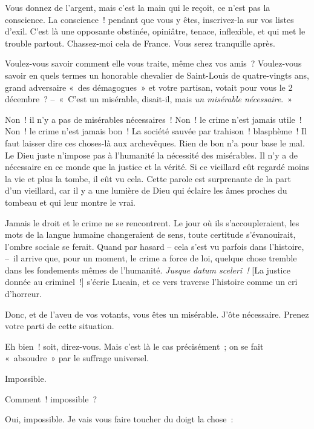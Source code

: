 \documentclass[french,twoside]{book} %
\begin{document}
Vous donnez de l’argent, mais c’est la main qui le reçoit, ce n’est pas la conscience. La conscience ! pendant que vous y êtes, inscrivez-la sur vos listes d’exil. C’est là une opposante obstinée, opiniâtre, tenace, inflexible, et qui met le trouble partout. Chassez-moi cela de France. Vous serez tranquille après.\par
Voulez-vous savoir comment elle vous traite, même chez vos amis ? Voulez-vous savoir en quels termes un honorable chevalier de Saint-Louis de quatre-vingts ans, grand adversaire « des démagogues » et votre partisan, votait pour vous le 2 décembre ? – « C’est un misérable, disait-il, mais \emph{un misérable nécessaire}. »\par
Non ! il n’y a pas de misérables nécessaires ! Non ! le crime n’est jamais utile ! Non ! le crime n’est jamais bon ! La société sauvée par trahison ! blasphème ! Il faut laisser dire ces choses-là aux archevêques. Rien de bon n’a pour base le mal. Le Dieu juste n’impose pas à l’humanité la nécessité des misérables. Il n’y a de nécessaire en ce monde que la justice et la vérité. Si ce vieillard eût regardé moins la vie et plus la tombe, il eût vu cela. Cette parole est surprenante de la part d’un vieillard, car il y a une lumière de Dieu qui éclaire les âmes proches du tombeau et qui leur montre le vrai.\par
Jamais le droit et le crime ne se rencontrent. Le jour où ils s’accoupleraient, les mots de la langue humaine changeraient de sens, toute certitude s’évanouirait, l’ombre sociale se ferait. Quand par hasard – cela s’est vu parfois dans l’histoire, – il arrive que, pour un moment, le crime a force de loi, quelque chose tremble dans les fondements mêmes de l’humanité. \emph{Jusque datum sceleri !} [La justice donnée au criminel !] s’écrie Lucain, et ce vers traverse l’histoire comme un cri d’horreur.\par
Donc, et de l’aveu de vos votants, vous êtes un misérable. J’ôte nécessaire. Prenez votre parti de cette situation.\par
Eh bien ! soit, direz-vous. Mais c’est là le cas précisément ; on se fait « absoudre » par le suffrage universel.\par
Impossible.\par
Comment ! impossible ?\par
Oui, impossible. Je vais vous faire toucher du doigt la chose :
\end{document}
